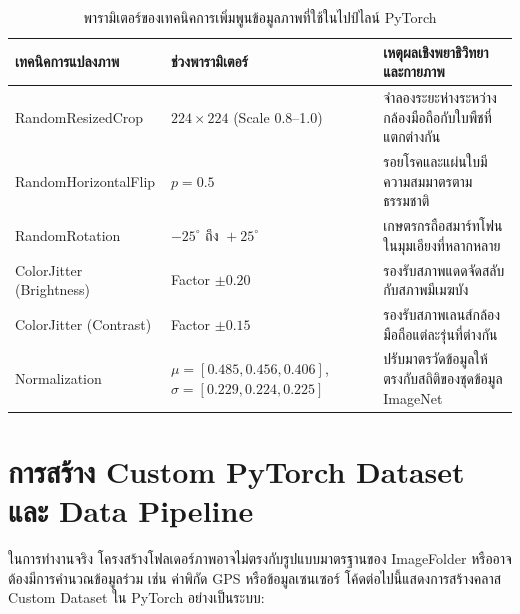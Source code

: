 \begin{table}[H]
\caption{พารามิเตอร์ของเทคนิคการเพิ่มพูนข้อมูลภาพที่ใช้ในไปป์ไลน์ PyTorch}
\label{tab:ch02_aug_params}
\begin{tabularx}{\textwidth}{L{3.4cm}L{2.4cm}Y}
\toprule
\textbf{เทคนิคการแปลงภาพ} & \textbf{ช่วงพารามิเตอร์} & \textbf{เหตุผลเชิงพยาธิวิทยาและกายภาพ} \\
\midrule
RandomResizedCrop & $224 \times 224$ (Scale 0.8--1.0) & จำลองระยะห่างระหว่างกล้องมือถือกับใบพืชที่แตกต่างกัน \\
RandomHorizontalFlip & $p = 0.5$ & รอยโรคและแผ่นใบมีความสมมาตรตามธรรมชาติ \\
RandomRotation & $-25^{\circ} \text{ ถึง } +25^{\circ}$ & เกษตรกรถือสมาร์ทโฟนในมุมเอียงที่หลากหลาย \\
ColorJitter (Brightness) & Factor $\pm 0.20$ & รองรับสภาพแดดจัดสลับกับสภาพมีเมฆบัง \\
ColorJitter (Contrast) & Factor $\pm 0.15$ & รองรับสภาพเลนส์กล้องมือถือแต่ละรุ่นที่ต่างกัน \\
Normalization & $\mu=[0.485, 0.456, 0.406]$, $\sigma=[0.229, 0.224, 0.225]$ & ปรับมาตรวัดข้อมูลให้ตรงกับสถิติของชุดข้อมูล ImageNet \\
\bottomrule
\end{tabularx}
\end{table}

\section{การสร้าง Custom PyTorch Dataset และ Data Pipeline}

ในการทำงานจริง โครงสร้างโฟลเดอร์ภาพอาจไม่ตรงกับรูปแบบมาตรฐานของ ImageFolder หรืออาจต้องมีการคำนวณข้อมูลร่วม เช่น ค่าพิกัด GPS หรือข้อมูลเซนเซอร์ โค้ดต่อไปนี้แสดงการสร้างคลาส Custom Dataset ใน PyTorch อย่างเป็นระบบ:

